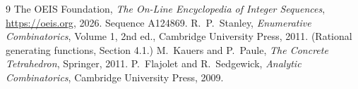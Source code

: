 \documentclass[11pt,a4paper]{article}
\theoremstyle{plain}
\theoremstyle{definition}
\begin{document}
\begin{thebibliography}{9}
 The OEIS Foundation, \emph{The On-Line Encyclopedia of Integer
Sequences}, \url{https://oeis.org}, 2026. Sequence A124869.
 R.~P.~Stanley, \emph{Enumerative Combinatorics}, Volume 1, 2nd ed.,
Cambridge University Press, 2011. (Rational generating functions, Section 4.1.)
 M.~Kauers and P.~Paule, \emph{The Concrete Tetrahedron}, Springer, 2011.
 P.~Flajolet and R.~Sedgewick, \emph{Analytic Combinatorics}, Cambridge
University Press, 2009.
\end{thebibliography}
\end{document}
